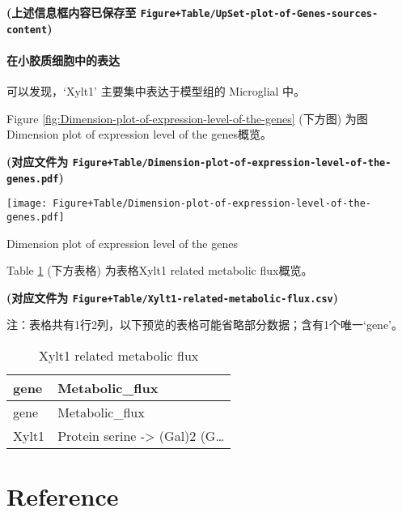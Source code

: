 \documentclass[
]{article}
\begin{document}
\textbf{(上述信息框内容已保存至 \texttt{Figure+Table/UpSet-plot-of-Genes-sources-content})}

\hypertarget{ux5728ux5c0fux80f6ux8d28ux7ec6ux80deux4e2dux7684ux8868ux8fbe}{%
\paragraph{在小胶质细胞中的表达}\label{ux5728ux5c0fux80f6ux8d28ux7ec6ux80deux4e2dux7684ux8868ux8fbe}}

可以发现，`Xylt1' 主要集中表达于模型组的 Microglial 中。

Figure \ref{fig:Dimension-plot-of-expression-level-of-the-genes} (下方图) 为图Dimension plot of expression level of the genes概览。

\textbf{(对应文件为 \texttt{Figure+Table/Dimension-plot-of-expression-level-of-the-genes.pdf})}

\def\@captype{figure}
\begin{center}
\texttt{[image: Figure+Table/Dimension-plot-of-expression-level-of-the-genes.pdf]}
\caption{Dimension plot of expression level of the genes}\label{fig:Dimension-plot-of-expression-level-of-the-genes}
\end{center}

Table \ref{tab:Xylt1-related-metabolic-flux} (下方表格) 为表格Xylt1 related metabolic flux概览。

\textbf{(对应文件为 \texttt{Figure+Table/Xylt1-related-metabolic-flux.csv})}

\begin{center}\begin{tcolorbox}[colback=gray!10, colframe=gray!50, width=0.9\linewidth, arc=1mm, boxrule=0.5pt]注：表格共有1行2列，以下预览的表格可能省略部分数据；含有1个唯一`gene'。
\end{tcolorbox}
\end{center}

\begin{longtable}[]{@{}ll@{}}
\caption{\label{tab:Xylt1-related-metabolic-flux}Xylt1 related metabolic flux}\tabularnewline
\toprule
gene & Metabolic\_flux\tabularnewline
\midrule
\endfirsthead
\toprule
gene & Metabolic\_flux\tabularnewline
\midrule
\endhead
Xylt1 & Protein serine -\textgreater{} (Gal)2 (G\ldots{}\tabularnewline
\bottomrule
\end{longtable}

\hypertarget{bibliography}{%
\section*{Reference}\label{bibliography}}
\end{document}
